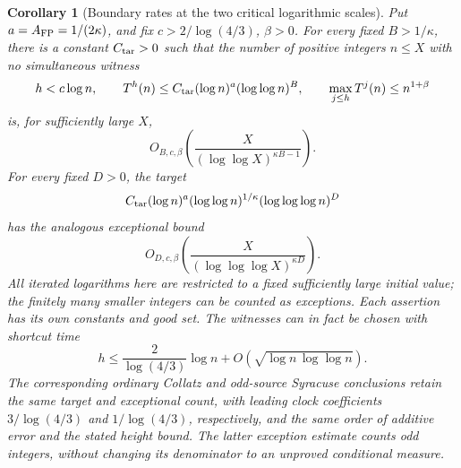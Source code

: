\documentclass[11pt]{article}
\newtheorem{corollary}[proposition]{Corollary}
\theoremstyle{remark}\newtheorem{remark}[proposition]{Remark}
\begin{document}
\begin{corollary}[Boundary rates at the two critical logarithmic scales]
\label{cor:shaik-critical-rates}
Put \(a=A_{\rm FP}=1/(2\kappa)\), and fix
\(c>2/\log(4/3)\), \(\beta>0\).
For every fixed \(B>1/\kappa\), there is a constant \(C_{\rm tar}>0\)
such that the number of positive integers \(n\le X\) with no simultaneous
witness
\[
 h<c\log n,\qquad
 T^h(n)\le C_{\rm tar}(\log n)^a(\log\log n)^B,\qquad
 \max_{j\le h}T^j(n)\le n^{1+\beta}
\]
is, for sufficiently large \(X\),
\begin{equation}\label{eq:shaik-critical-B-rate}
 O_{B,c,\beta}\left(\frac{X}{(\log\log X)^{\kappa B-1}}\right).
\end{equation}
For every fixed \(D>0\), the target
\[
 C_{\rm tar}(\log n)^a(\log\log n)^{1/\kappa}
                      (\log\log\log n)^D
\]
has the analogous exceptional bound
\begin{equation}\label{eq:shaik-critical-D-rate}
 O_{D,c,\beta}\left(\frac{X}{(\log\log\log X)^{\kappa D}}\right).
\end{equation}
All iterated logarithms here are restricted to a fixed sufficiently
large initial value; the finitely many smaller integers can be counted
as exceptions. Each assertion has its own constants and good set.
The witnesses can in fact be chosen with shortcut time
\[
 h\le\frac{2}{\log(4/3)}\log n+
       O(\sqrt{\log n\,\log\log n}).
\]
The corresponding ordinary Collatz and odd-source Syracuse conclusions
retain the same target and exceptional count, with leading clock
coefficients \(3/\log(4/3)\) and \(1/\log(4/3)\), respectively, and
the same order of additive error and the stated height bound.
The latter exception estimate counts odd integers, without changing its
denominator to an unproved conditional measure.
\end{corollary}
\end{document}
